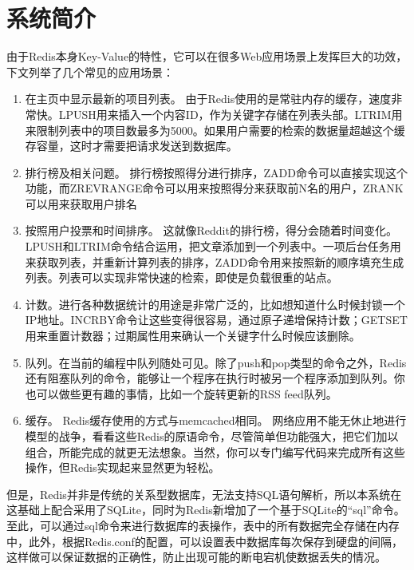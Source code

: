 \documentclass{zjutthesis}
\begin{document}
\section{系统简介}
由于Redis本身Key-Value的特性，它可以在很多Web应用场景上发挥巨大的功效，下文列举了几个常见的应用场景：
\begin{enumerate}[label=（\arabic*）]
\item{在主页中显示最新的项目列表。
由于Redis使用的是常驻内存的缓存，速度非常快。LPUSH用来插入一个内容ID，作为关键字存储在列表头部。LTRIM用来限制列表中的项目数最多为5000。如果用户需要的检索的数据量超越这个缓存容量，这时才需要把请求发送到数据库。}

\item{排行榜及相关问题。
排行榜按照得分进行排序，ZADD命令可以直接实现这个功能，而ZREVRANGE命令可以用来按照得分来获取前N名的用户，ZRANK可以用来获取用户排名}

\item{按照用户投票和时间排序。
这就像Reddit的排行榜，得分会随着时间变化。LPUSH和LTRIM命令结合运用，把文章添加到一个列表中。一项后台任务用来获取列表，并重新计算列表的排序，ZADD命令用来按照新的顺序填充生成列表。列表可以实现非常快速的检索，即使是负载很重的站点。}

\item{计数。进行各种数据统计的用途是非常广泛的，比如想知道什么时候封锁一个IP地址。INCRBY命令让这些变得很容易，通过原子递增保持计数；GETSET用来重置计数器；过期属性用来确认一个关键字什么时候应该删除。}

\item{队列。在当前的编程中队列随处可见。除了push和pop类型的命令之外，Redis还有阻塞队列的命令，能够让一个程序在执行时被另一个程序添加到队列。你也可以做些更有趣的事情，比如一个旋转更新的RSS feed队列。}

\item{缓存。
Redis缓存使用的方式与memcached相同。
网络应用不能无休止地进行模型的战争，看看这些Redis的原语命令，尽管简单但功能强大，把它们加以组合，所能完成的就更无法想象。当然，你可以专门编写代码来完成所有这些操作，但Redis实现起来显然更为轻松。}
\end{enumerate}

但是，Redis并非是传统的关系型数据库，无法支持SQL语句解析，所以本系统在这基础上配合采用了SQLite，同时为Redis新增加了一个基于SQLite的“sql”命令。至此，可以通过sql命令来进行数据库的表操作，表中的所有数据完全存储在内存中，此外，根据Redis.conf的配置，可以设置表中数据库每次保存到硬盘的间隔，这样做可以保证数据的正确性，防止出现可能的断电宕机使数据丢失的情况。
\end{document}
